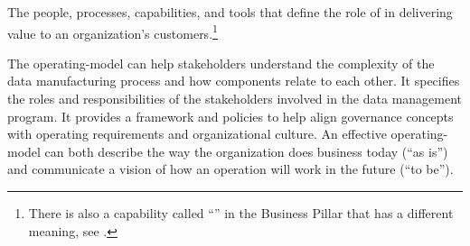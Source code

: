 %
%
The people, processes, capabilities, and tools that define the role of  in delivering
value to an organization’s customers.\footnote{%
    There is also a capability called ``'' in the
    Business Pillar that has a different meaning, see .
}

The \gls{operating-model} can help stakeholders understand the complexity of the data manufacturing process and how
components relate to each other.
It specifies the roles and responsibilities of the stakeholders involved in the data management program.
It provides a framework and policies to help align governance concepts with operating requirements and
organizational culture.
An effective \gls{operating-model} can both describe the way the organization does business today (“as is”) and
communicate a vision of how an operation will work in the future (“to be”).

